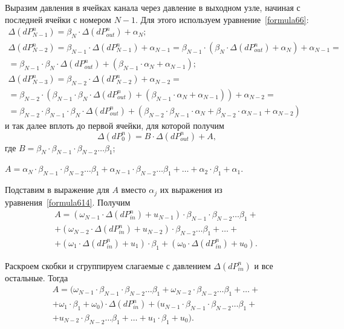 Выразим давления в ячейках канала через давление в выходном узле, начиная с последней ячейки с номером $N-1$. Для этого используем уравнение~\eqref{formula66}:
\begin{eqnarray}
\label{formula617}
\Delta(dP_{N-1}^n)=\beta_N \cdot \Delta(dP_{out}^n) + \alpha_N; \nonumber ~\\
\Delta(dP_{N-2}^n)=\beta_{N-1} \cdot \Delta(dP_{N-1}^n) + \alpha_{N-1}=\beta_{N-1} \cdot (\beta_N \cdot \Delta(dP_{out}^n) + \alpha_N) + \alpha_{N-1} = \nonumber ~\\
= \beta_{N-1} \cdot \beta_N \cdot \Delta(dP_{out}^n) + (\beta_{N-1} \cdot \alpha_N + \alpha_{N-1}); \nonumber ~\\
\Delta(dP_{N-3}^n)=\beta_{N-2} \cdot \Delta(dP_{N-2}^n) + \alpha_{N-2} = \nonumber ~\\
= \beta_{N-2} \cdot (\beta_{N-1} \cdot \beta_N \cdot \Delta(dP_{out}^n) + (\beta_{N-1} \cdot \alpha_N + \alpha_{N-1})) + \alpha_{N-2} = \nonumber ~\\
= \beta_{N-2} \cdot \beta_{N-1} \cdot \beta_N \cdot \Delta(dP_{out}^n) + (\beta_{N-2} \cdot \beta_{N-1} \cdot \alpha_N + \beta_{N-2} \cdot \alpha_{N-1} + \alpha_{N-2})
\end{eqnarray}
и так далее вплоть до первой ячейки, для которой получим
\begin{equation}
\label{formula618}
\Delta(dP_0^n)=B \cdot \Delta(dP_{out}^n) + A,
\end{equation}
где $B = \beta_N \cdot \beta_{N-1} \cdot \beta_{N-2} \dots \beta_1$; 

\noindent $A = \alpha_N \cdot \beta_{N-1} \cdot \beta_{N-2} \dots \beta_1 + \alpha_{N-1} \cdot \beta_{N-2} \dots \beta_1 + \dots + \alpha_2 \cdot \beta_1 + \alpha_1$. 

Подставим в выражение для $A$ вместо $\alpha_j$ их выражения из уравнения~\eqref{formula614}. Получим
\begin{eqnarray}
\label{formula619}
A=(\omega_{N-1} \cdot \Delta(dP_{in}^n) + u_{N-1}) \cdot \beta_{N-1} \cdot \beta_{N-2} \dots \beta_1 + \nonumber ~\\
+ (\omega_{N-2} \cdot \Delta(dP_{in}^n) + u_{N-2}) \cdot \beta_{N-2} \dots \beta_1 + \dots + \nonumber ~\\
+ (\omega_1 \cdot \Delta(dP_{in}^n) + u_1) \cdot \beta_1 + (\omega_0 \cdot \Delta(dP_{in}^n) + u_0).
\end{eqnarray} 

Раскроем скобки и сгруппируем слагаемые с давлением $\Delta(dP_{in}^n)$ и все остальные. Тогда
\begin{eqnarray}
\label{formula620}
A=(\omega_{N-1} \cdot \beta_{N-1} \cdot \beta_{N-2} \dots \beta_1 + \omega_{N-2} \cdot \beta_{N-2} \dots \beta_1 + \dots + \nonumber ~\\
+ \omega_1 \cdot \beta_1 + \omega_0) \cdot \Delta(dP_{in}^n) + (u_{N-1} \cdot \beta_{N-1} \cdot \beta_{N-2} \dots \beta_1 + \nonumber ~\\
+ u_{N-2} \cdot \beta_{N-2} \dots \beta_1 + \dots + u_1 \cdot \beta_1 + u_0).
\end{eqnarray}

